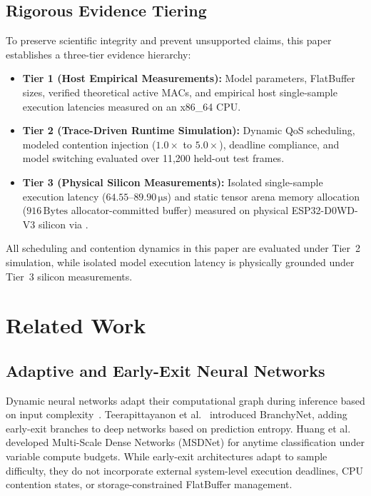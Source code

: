 \documentclass[journal]{IEEEtran}
\begin{document}
\subsection{Rigorous Evidence Tiering}
To preserve scientific integrity and prevent unsupported claims, this paper establishes a three-tier evidence hierarchy:
\begin{itemize}
    \item \textbf{Tier 1 (Host Empirical Measurements):} Model parameters, FlatBuffer sizes, verified theoretical active MACs, and empirical host single-sample execution latencies measured on an x86\_64 CPU.
    \item \textbf{Tier 2 (Trace-Driven Runtime Simulation):} Dynamic QoS scheduling, modeled contention injection ($1.0\times$ to $5.0\times$), deadline compliance, and model switching evaluated over 11,200 held-out test frames.
    \item \textbf{Tier 3 (Physical Silicon Measurements):} Isolated single-sample execution latency ($64.55\text{--}89.90\,\si{\micro\second}$) and static tensor arena memory allocation ($916\,\text{Bytes}$ allocator-committed buffer) measured on physical ESP32-D0WD-V3 silicon via .
\end{itemize}
All scheduling and contention dynamics in this paper are evaluated under Tier~2 simulation, while isolated model execution latency is physically grounded under Tier~3 silicon measurements.

\section{Related Work}
\subsection{Adaptive and Early-Exit Neural Networks}
Dynamic neural networks adapt their computational graph during inference based on input complexity~\cite{scardapane2020should,han2024adaptive}. Teerapittayanon et al.~\cite{teerapittayanon2016branchynet} introduced BranchyNet, adding early-exit branches to deep networks based on prediction entropy. Huang et al.~\cite{huang2018multi} developed Multi-Scale Dense Networks (MSDNet) for anytime classification under variable compute budgets. While early-exit architectures adapt to sample difficulty, they do not incorporate external system-level execution deadlines, CPU contention states, or storage-constrained FlatBuffer management.
\end{document}
